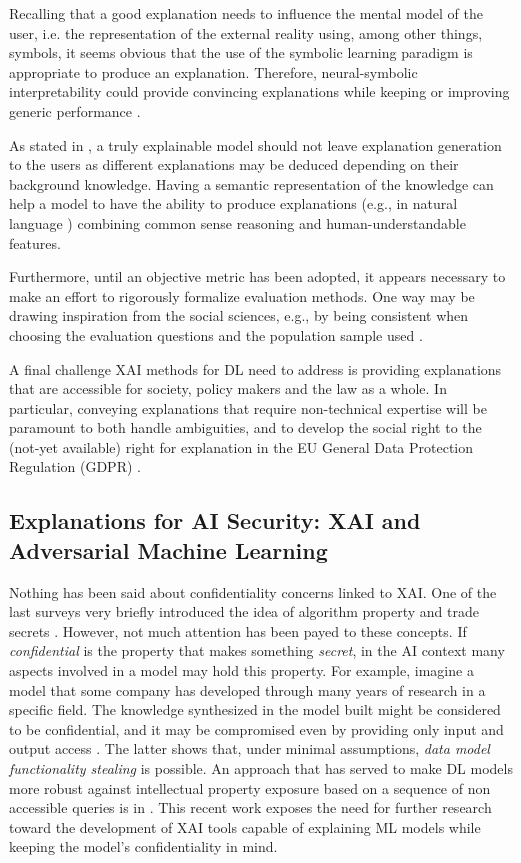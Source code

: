 \documentclass[final]{elsarticle}
\begin{document}
Recalling that a good explanation needs to influence the mental model of the user, i.e. the representation of the external reality using, among other things, symbols, it seems obvious that the use of the symbolic learning paradigm is appropriate to produce an explanation. Therefore, neural-symbolic interpretability could provide convincing explanations while keeping or improving generic performance \cite{Donadello17}. 

As stated in \cite{WhatDoesExplainableAImean}, a truly explainable model should not leave explanation generation to the users as different explanations may be deduced depending on their background knowledge. Having a semantic representation of the knowledge can help a model to have the ability to produce explanations (e.g., in natural language \cite{Bennetot19}) combining common sense reasoning and human-understandable features. 

Furthermore, until an objective metric has been adopted, it appears necessary to make an effort to rigorously formalize evaluation methods. One way may be drawing inspiration from the social sciences, e.g., by being consistent when choosing the evaluation questions and the population sample used \cite{Kelley03}.

A final challenge XAI methods for DL need to address is providing explanations that are accessible for society, policy makers and the law as a whole. In particular, conveying explanations that require non-technical expertise will be paramount to both handle ambiguities, and to develop the social right to the (not-yet available) right for explanation in the EU General Data Protection Regulation (GDPR) \cite{Wachter17}.

\subsection{{\color{black}Explanations for AI Security: XAI and Adversarial Machine Learning}} \label{ssec:robust_adv}

Nothing has been said about confidentiality concerns linked to XAI. One of the last surveys very briefly introduced the idea of algorithm property and trade secrets \cite{adadi2018peeking}. However, not much attention has been payed to these concepts. If \emph{confidential} is the property that makes something \textit{secret}, in the AI context many aspects involved in a model may hold this property. For example, imagine a  model that some company has developed through many years of research in a specific field. The knowledge synthesized in the model built might be considered to be confidential, and it may be compromised even by providing only input and output access \cite{Orekondy18}. The latter shows that, under minimal assumptions, \textit{data model functionality stealing} is possible. An approach that has served to make DL models more robust against intellectual property exposure based on a sequence of non accessible queries is in \cite{Oh19}. This recent work exposes the need for further research toward the development of XAI tools capable of explaining ML models while keeping the model's confidentiality in mind. 
\end{document}
